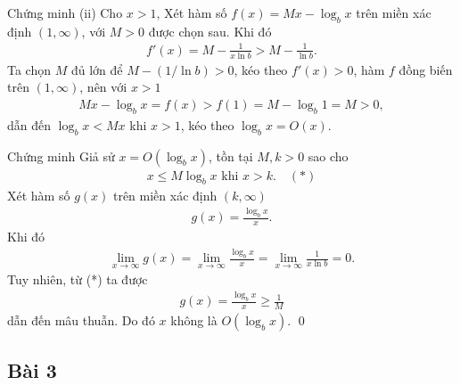 \documentclass[9pt]{beamer}
\begin{document}
\begin{frame}
    \begin{exampleblock}{Chứng minh}
    (ii) Cho $x > 1$, Xét hàm số $f(x) = Mx - \log_b x$ trên miền xác định $(1, \infty)$, với $M > 0$ được chọn sau. Khi đó
    \begin{align*}
        f'(x) = M - \frac{1}{x \ln b} > M - \frac{1}{\ln b}.
    \end{align*}
    Ta chọn $M$ đủ lớn để $M - (1/ \ln b) > 0$, kéo theo $f'(x) > 0$, hàm $f$ đồng biến trên $(1, \infty)$, nên với $x > 1$
    \begin{align*}
        Mx - \log_b x = f(x) > f(1) = M - \log_b 1 = M > 0,
    \end{align*}
    dẫn đến $\log_b x < Mx$ khi $x > 1$, kéo theo $\log_b x = O(x)$.
    \end{exampleblock}
\end{frame}

\begin{frame}
    \begin{exampleblock}{Chứng minh}
    Giả sử $x = O(\log_b x)$, tồn tại $M, k > 0$ sao cho
    \begin{align*}
        x \le M \log_b x \text{ khi } x > k. \quad (*)
    \end{align*}
    Xét hàm số $g(x)$ trên miền xác định $(k, \infty)$
    \begin{align*}
        g(x) = \frac{\log_b x}{x}.
    \end{align*}
    Khi đó
    \begin{align*}
        \lim_{x \to \infty} g(x) = \lim_{x \to \infty} \frac{\log_b x}{x}
        = \lim_{x \to \infty} \frac{1}{x \ln b} = 0.
    \end{align*}
    Tuy nhiên, từ (*) ta được
    \begin{align*}
        g(x) = \frac{\log_b x}{x} \ge \frac{1}{M}
    \end{align*}
    dẫn đến mâu thuẫn. Do đó $x$ không là $O(\log_b x)$. \hfill \qed
    \end{exampleblock}
\end{frame}

\subsection{Bài 3}
\end{document}
